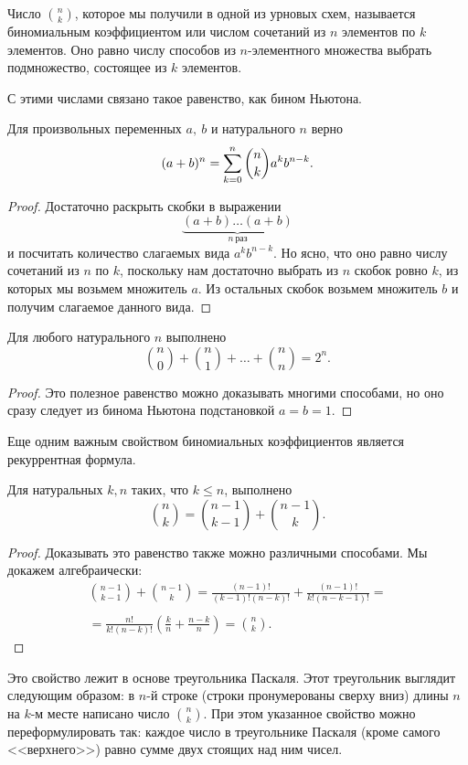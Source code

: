 Число $\binom{n}{k}$, которое мы получили в одной из урновых схем,
называется биномиальным коэффициентом или числом сочетаний из $n$
элементов по $k$ элементов. Оно равно числу способов из $n$-элементного
множества выбрать подмножество, состоящее из $k$ элементов.

С этими числами связано такое равенство, как бином Ньютона.

\begin{theorem}
    Для произвольных переменных $a,\ b$ и натурального $n$ верно
    \[
        (a+b)^n = \sum\limits_{k=0}^n \binom{n}{k} a^k b^{n-k}.
        \]
\end{theorem}
\begin{proof}
    Достаточно раскрыть скобки в выражении
    \[
        \underbrace{(a+b) \ldots (a+b)}_{n\ \text{раз}}
        \]
    и посчитать количество слагаемых вида $a^kb^{n-k}$. Но ясно, что
    оно равно числу сочетаний из $n$ по $k$, поскольку нам достаточно
    выбрать из $n$ скобок ровно $k$, из которых мы возьмем множитель
    $a$. Из остальных скобок возьмем множитель $b$ и получим
    слагаемое данного вида.
\end{proof}

\begin{corollary}
    Для любого натурального $n$ выполнено
    \[
        \binom{n}{0} + \binom{n}{1} + \ldots + \binom{n}{n} = 2^n.
        \]
\end{corollary}
\begin{proof}
    Это полезное равенство можно доказывать многими способами, но
    оно сразу следует из бинома Ньютона подстановкой $a = b = 1$.
\end{proof}

Еще одним важным свойством биномиальных коэффициентов является
рекуррентная формула.

\begin{statement}
    Для натуральных $k, n$ таких, что $k \leqslant n$, выполнено
    \[
        \binom{n}{k} = \binom{n-1}{k-1} + \binom{n-1}{k}.
        \]
\end{statement}
\begin{proof}
    Доказывать это равенство также можно различными способами. Мы
    докажем алгебраически:
    \begin{multline*}
        \binom{n-1}{k-1} + \binom{n-1}{k} = \frac{(n-1)!}{(k-1)!
        (n-k)!} + \frac{(n-1)!}{k!(n-k-1)!} =\\\\= \frac{n!}{k!(n-k)!}
        \left( \frac{k}{n} + \frac{n-k}{n} \right) = \binom{n}{k}.
    \end{multline*}
\end{proof}
Это свойство лежит в основе треугольника Паскаля. Этот треугольник
выглядит следующим образом: в $n$-й строке (строки пронумерованы 
сверху вниз) длины $n$ на $k$-м месте написано число $\binom{n}{k}$. 
При этом указанное свойство можно переформулировать так: каждое число 
в треугольнике Паскаля (кроме самого <<верхнего>>) равно сумме двух 
стоящих над ним чисел.
